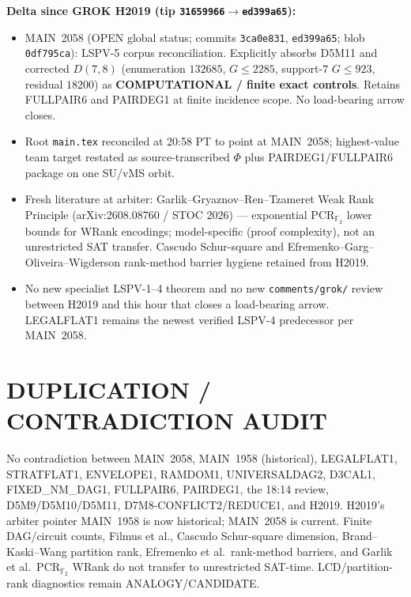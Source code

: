 \documentclass[11pt]{article}
\begin{document}
\textbf{Delta since GROK H2019 (tip \texttt{31659966}$\to$\texttt{ed399a65}):}
\begin{itemize}
\item MAIN~2058 (OPEN global status; commits \texttt{3ca0e831}, \texttt{ed399a65};
blob \texttt{0df795ca}): LSPV-5 corpus reconciliation. Explicitly absorbs D5M11
and corrected $D(7,8)$ (enumeration $132685$, $G\le 2285$, support-$7$ $G\le 923$,
residual $18200$) as \textbf{COMPUTATIONAL / finite exact controls}. Retains
FULLPAIR6 and PAIRDEG1 at finite incidence scope. No load-bearing arrow closes.
\item Root \texttt{main.tex} reconciled at 20:58 PT to point at MAIN~2058;
highest-value team target restated as source-transcribed $\Phi$ plus
PAIRDEG1/FULLPAIR6 package on one SU/vMS orbit.
\item Fresh literature at arbiter: Garlik--Gryaznov--Ren--Tzameret Weak Rank
Principle (arXiv:2608.08760 / STOC 2026) --- exponential PCR$_{\mathbb F_2}$
lower bounds for WRank encodings; model-specific (proof complexity), not an
unrestricted SAT transfer. Cascudo Schur-square and Efremenko--Garg--Oliveira--Wigderson
rank-method barrier hygiene retained from H2019.
\item No new specialist LSPV-1--4 theorem and no new \texttt{comments/grok/}
review between H2019 and this hour that closes a load-bearing arrow. LEGALFLAT1
remains the newest verified LSPV-4 predecessor per MAIN~2058.
\end{itemize}

\section*{DUPLICATION / CONTRADICTION AUDIT}
No contradiction between MAIN~2058, MAIN~1958 (historical), LEGALFLAT1,
STRATFLAT1, ENVELOPE1, RAMDOM1, UNIVERSALDAG2, D3CAL1, FIXED\_NM\_DAG1,
FULLPAIR6, PAIRDEG1, the 18:14 review, D5M9/D5M10/D5M11, D7M8-CONFLICT2/REDUCE1,
and H2019. H2019's arbiter pointer MAIN~1958 is now historical; MAIN~2058 is
current. Finite DAG/circuit counts, Filmus et al., Cascudo Schur-square
dimension, Brand--Kaski--Wang partition rank, Efremenko et al.\ rank-method
barriers, and Garlik et al.\ PCR$_{\mathbb F_2}$ WRank do not transfer to
unrestricted SAT-time. LCD/partition-rank diagnostics remain ANALOGY/CANDIDATE.
\end{document}
